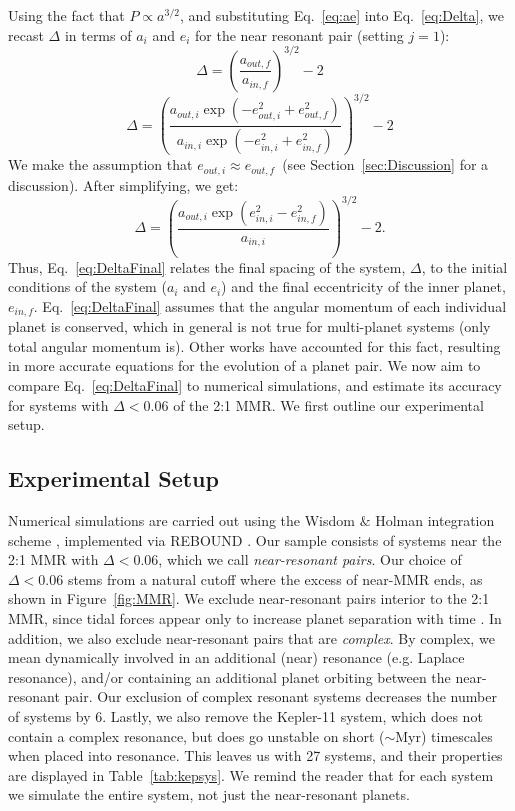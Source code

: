 Using the fact that $P \propto a^{3/2}$, and substituting Eq.~\ref{eq:ae} into Eq.~\ref{eq:Delta}, we recast $\Delta$ in terms of $a_i$ and $e_i$ for the near resonant pair (setting $j=1$):
\begin{equation}
\Delta = \left(\frac{a_{out,f}}{a_{in,f}} \right)^{3/2} - 2
\label{eq:DeltaInitial}
\end{equation}
\begin{equation*}
\Delta = \left(\frac{a_{out,i}\exp(-e_{out,i}^2 + e_{out,f}^2)}{a_{in,i}\exp(-e_{in,i}^2 + e_{in,f}^2)} \right)^{3/2} - 2
\end{equation*}
We make the assumption that $e_{out,i} \approx e_{out,f}$~(see Section~\ref{sec:Discussion} for a discussion).
After simplifying, we get:
\begin{equation}
\Delta = \left(\frac{a_{out,i}\exp(e_{in,i}^2 - e_{in,f}^2)}{a_{in,i}} \right)^{3/2} - 2.
\label{eq:DeltaFinal}
\end{equation}
Thus, Eq.~\ref{eq:DeltaFinal} relates the final spacing of the system, $\Delta$, to the initial conditions of the system ($a_i$ and $e_i$) and the final eccentricity of the inner planet, $e_{in,f}$.
Eq.~\ref{eq:DeltaFinal} assumes that the angular momentum of each individual planet is conserved, which in general is not true for multi-planet systems (only total angular momentum is).
Other works \citep{LithwickWu2012,Batygin2013} have accounted for this fact, resulting in more accurate equations for the evolution of a planet pair.
We now aim to compare Eq.~\ref{eq:DeltaFinal} to numerical simulations, and estimate its accuracy for \kep{} systems with $\Delta < 0.06$ of the 2:1 MMR. 
We first outline our experimental setup.

\subsection{Experimental Setup}
\label{sec:expsetup}
Numerical simulations are carried out using the Wisdom $\& $ Holman integration scheme \citep{Wisdom1991}, implemented via REBOUND \citep{Rein2012}. 
Our sample consists of \kep{} systems near the 2:1 MMR with $\Delta < 0.06$, which we call \textit{near-resonant pairs}.
Our choice of $\Delta < 0.06$ stems from a natural cutoff where the excess of near-MMR ends, as shown in Figure~\ref{fig:MMR}. 
We exclude near-resonant pairs interior to the 2:1 MMR, since tidal forces appear only to increase planet separation with time \citep[e.g.][]{LithwickWu2012}.
In addition, we also exclude near-resonant pairs that are \textit{complex}. 
By complex, we mean dynamically involved in an additional (near) resonance (e.g. Laplace resonance), and/or containing an additional planet orbiting between the near-resonant pair. 
Our exclusion of complex resonant systems decreases the number of \kep{} systems by 6.
Lastly, we also remove the Kepler-11 system, which does not contain a complex resonance, but does go unstable on short ($\sim$Myr) timescales when placed into resonance. 
This leaves us with 27 \kep{} systems, and their properties are displayed in Table~\ref{tab:kepsys}.
We remind the reader that for each \kep{} system we simulate the entire system, not just the near-resonant planets. 

